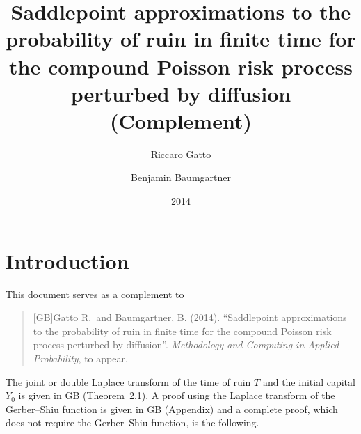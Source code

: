 \documentclass[final]{article}
\title{%
    Saddlepoint approximations to the probability of ruin in finite time for the
    compound Poisson risk process perturbed by diffusion (Complement)%
}
\date{2014}
\author{Riccaro Gatto \and Benjamin Baumgartner}
\newcommand*{\1}{\mathbb{1}}
\begin{document}
\maketitle

\section*{Introduction}

This document serves as a complement to
\begin{quote}
    [GB]\quad Gatto R.\ and Baumgartner, B. (2014).
    ``Saddlepoint approximations to the probability of ruin in finite time for the
    compound Poisson risk process perturbed by diffusion''.
    \emph{Methodology and Computing in Applied Probability}, to appear.
\end{quote}

The joint or double Laplace transform of the time of ruin $T$ and the initial capital
$Y_{0}$ is given in GB (Theorem~2.1).  A proof using the Laplace transform of the
Gerber--Shiu function is given in GB (Appendix) and a complete proof, which does not
require the Gerber--Shiu function, is the following.
\end{document}
